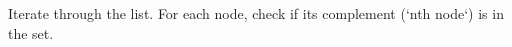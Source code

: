 \documentclass[preview]{standalone}
\begin{document}
Iterate through the list. For each node, check if its complement (`nth node`) is in the set.\\
\end{document}
